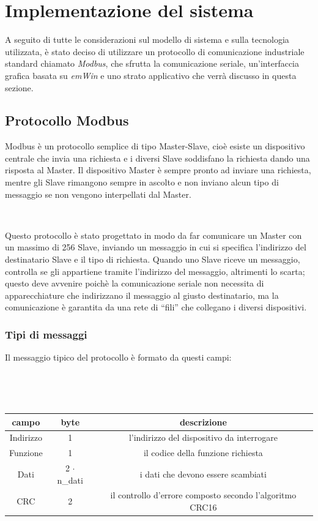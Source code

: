 \documentclass[a4paper,titlepage]{book}
\begin{document}
\chapter{Implementazione del sistema}


A seguito di tutte le considerazioni sul modello di sistema e sulla tecnologia utilizzata, è stato deciso di utilizzare un protocollo di comunicazione industriale standard chiamato \textit{Modbus}, che sfrutta la comunicazione seriale, un'interfaccia grafica basata su \textit{emWin} e uno strato applicativo che verrà discusso in questa sezione. 

\section{Protocollo Modbus}


Modbus è un protocollo semplice di tipo Master-Slave, cioè esiste un dispositivo centrale che invia una richiesta e i diversi Slave soddisfano la richiesta dando una risposta al Master. Il dispositivo Master è sempre pronto ad inviare una richiesta, mentre gli Slave rimangono sempre in ascolto e non inviano alcun tipo di messaggio se non vengono interpellati dal Master.

~

Questo protocollo è stato progettato in modo da far comunicare un Master con un massimo di 256 Slave, inviando un messaggio in cui si specifica l'indirizzo del destinatario Slave e il tipo di richiesta. Quando uno Slave riceve un messaggio, controlla se gli appartiene tramite l'indirizzo del messaggio, altrimenti lo scarta; questo deve avvenire poichè la comunicazione seriale non necessita di apparecchiature che indirizzano il messaggio al giusto destinatario, ma la comunicazione è garantita da una rete di ``fili'' che collegano i diversi dispositivi.

\subsection{Tipi di messaggi}

Il messaggio tipico del protocollo è formato da questi campi:

~

~

\begin{tabular}{|c  c  c|}
\hline
\multicolumn{1}{|c|}{\textbf {campo}} & \multicolumn{1}{c}{\textbf {byte}} & \multicolumn{1}{|c|}{\textbf {descrizione}} \\
\hline
Indirizzo	&	1	&	l'indirizzo del dispositivo da interrogare\\

Funzione	&	1	&	il codice della funzione richiesta\\

Dati		&	2 $\cdot$ n\_dati	&	i dati che devono essere scambiati \\

CRC		&	2			&	il controllo d'errore composto secondo l'algoritmo CRC16 \\

\hline
\end{tabular}
\end{document}
